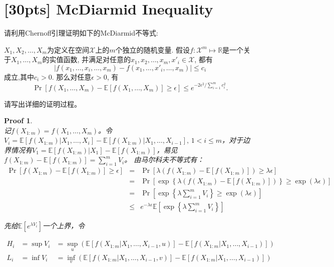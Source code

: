 \documentclass[a4paper,UTF8]{article}
\numberwithin{equation}{section}
\newtheorem*{myProof}{Proof}
\begin{document}
\section{[30pts] McDiarmid Inequality}
\noindent	请利用Chernoff引理证明如下的McDiarmid不等式:
	\begin{thm-box}
	$X_1,X_2,\ldots,X_m$为定义在空间$\mathcal{X}$上的$m$个独立的随机变量. 假设$f\colon \mathcal{X}^m\mapsto \mathbb{R}$是一个关于$X_1,\ldots,X_m$的实值函数, 并满足对任意的$x_1,x_2,\ldots,x_m,x'_i\in\mathcal{X}$, 都有
	\[
	|f(x_1,\ldots,x_i,\ldots,x_m)-f(x_1,\ldots,x'_i,\ldots,x_m)|\leq c_i
	\]
	成立,其中$c_i >0$. 那么对任意$\epsilon>0$, 有
	\[
	\Pr[f(X_1,\ldots,X_m)-\mathbb{E}[f(X_1,\ldots,X_m)]\geq\epsilon]\leq e^{-2\epsilon^2/\sum_{i=1}^mc_i^2}.
	\]
\end{thm-box}
	请写出详细的证明过程。
	\begin{myProof}~\\

记$f(X_{1:m}) = f(X_1, \ldots, X_m)$。令$V_i = \mathbb{E}[f(X_{1:m}) | X_1, \ldots, X_i] - \mathbb{E}[f(X_{1:m}) | X_1, \ldots, X_{i-1}],\,1 < i \le m$，对于边界情况有$V_1 = \mathbb{E}[f(X_{1:m}) | X_1] - \mathbb{E}[f(X_{1:m})]$，易见$f(X_{1:m}) - \mathbb{E}[f(X_{1:m})] = \sum_{i=1}^m V_i$。
由马尔科夫不等式有：
\begin{eqnarray*}
\Pr[f(X_{1:m})-\mathbb{E}[f(X_{1:m})] \geq \epsilon] &=& \Pr[\lambda\left(f(X_{1:m})-\mathbb{E}[f(X_{1:m})]\right) \geq \lambda\epsilon] \\
&=& \Pr[\exp\left\{\lambda\left(f(X_{1:m})-\mathbb{E}[f(X_{1:m})]\right)\right\} \geq \exp(\lambda\epsilon)] \\
&=& \Pr\left[\exp\left\{\lambda\sum_{i=1}^m V_i\right\} \geq \exp(\lambda\epsilon)\right] \\
&\le& e^{-\lambda \epsilon} \mathbb{E}\left[ \exp\left\{\lambda\sum_{i=1}^m V_i\right\} \right]
\end{eqnarray*}

先给$\mathbb{E}\left[ e^{\lambda V_i} \right]$一个上界，令

\begin{eqnarray*}
H_i &= \sup V_i &= \sup_u ( \mathbb{E}[f(X_{1:m}|X_1, \ldots, X_{i-1}, u) ] - \mathbb{E}[f(X_{1:m}|X_1, \ldots, X_{i-1}) ] ) \\
L_i &= \inf V_i &= \inf_v ( \mathbb{E}[f(X_{1:m}|X_1, \ldots, X_{i-1}, v) ] - \mathbb{E}[f(X_{1:m}|X_1, \ldots, X_{i-1}) ] ) \\
\end{eqnarray*}


\end{myProof}
\end{document}
